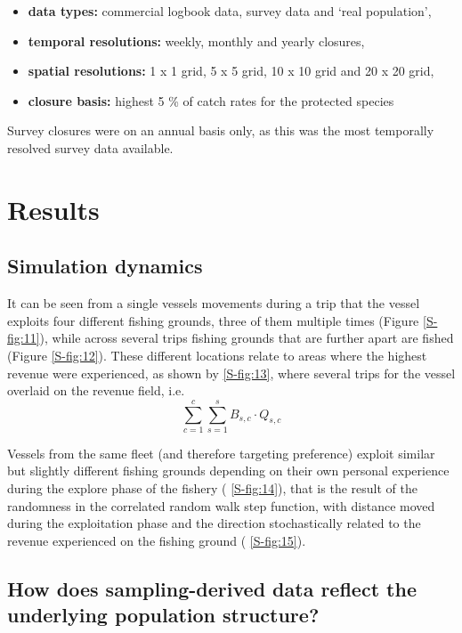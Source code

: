 \documentclass[review]{elsarticle}
\begin{document}
\begin{itemize}
	\item \textbf{data types:} commercial logbook data, survey data and
		`real population',
	\item \textbf{temporal resolutions:} weekly, monthly and yearly
		closures,
	\item \textbf{spatial resolutions:} 1 x 1 grid, 5 x 5 grid, 10 x 10
		grid and 20 x 20 grid,
	\item \textbf{closure basis:} highest 5 \%  of catch rates for the
		protected species
\end{itemize}

Survey closures were on an annual basis only, as this was the most temporally
resolved survey data available.

\section{Results}

\subsection{Simulation dynamics}

It can be seen from a single vessels movements during a trip that the vessel
exploits four different fishing grounds, three of them multiple times (Figure
\ref{S-fig:11}), while across several trips fishing grounds that are further
apart are fished (Figure \ref{S-fig:12}). These different locations relate to
areas where the highest revenue were experienced, as shown by
 \ref{S-fig:13}, where several trips for the vessel
overlaid on the revenue field, i.e. 
$$\sum^c_{c=1}\sum^s_{s=1} B_{s,c} \cdot Q_{s,c}$$

Vessels from the same fleet (and therefore targeting preference) exploit
similar but slightly different fishing grounds depending on their own personal
experience during the explore phase of the fishery (
\ref{S-fig:14}), that is the result of the randomness in the correlated random
walk step function, with distance moved during the exploitation phase and the
direction stochastically related to the revenue experienced on the fishing
ground (
\ref{S-fig:15}). 

\subsection{How does sampling-derived data reflect the underlying population
	structure?}
\end{document}
